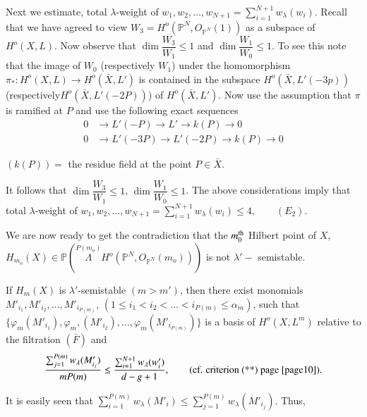 {\noindent
Next we estimate, total $\lambda$-weight of $w_{1}, w_{2} , \ldots ,
w_{N+1} =  \sum\limits^{N+1}_{i=1}   w_{\lambda}(w_{i})$. Recall that
we have agreed to view $W_{3} = H^o (\mathbb{P}^{N},
O_{\mathbb{P}^{N}} (1) )$ as a subspace of $H^o (X, L)$. Now observe
that $\dim \dfrac{W_{3}}{W_{1}} \leq 1$  and $ \dim \dfrac{W_{1}}{W_{0}}
\leq 1$. To see  this note that the image of $W_{0}$ (respectively
$W_{1}$) under the homomorphism $\pi_{*} : H^o (X , L) \to H^o
(\bar{X} , L')$ is contained in the subspace $H^o (\bar{X}, L'
(-3p))$ (respectively\pageoriginale $H^o (\bar{X}, L' (-2P))$)  of
$H^o (\bar{X}, L')$. Now use the assumption that $\pi$ is ramified at
$P$ and use the following exact sequences   
\begin{align*}
0  & \longrightarrow L' (-P)    \longrightarrow L'    \longrightarrow
k(P) \longrightarrow 0\\ 
0  & \longrightarrow L' (-3P)  \longrightarrow L' (-2P)
\longrightarrow k(P) \longrightarrow 0 
\end{align*}

$(k(P)) = $ the residue field at the point $P \in \bar{X}$. 

\noindent
It follows that $\dim \dfrac{W_{3}}{W_{1}} \leq 1$, $\dim
\dfrac{W_{1}}{W_{0}} \leq 1$. The above considerations imply that
total $\lambda$-weight of $w_{1}, w_{2} , \ldots , w_{N+1} =
\sum\limits^{N+1}_{i=1}  w_{\lambda}(w_{i}) \leq 4, \qquad (E_{2})$.  

We are now ready to get the contradiction that the $m^{\rm th}_{0}$
Hilbert point of $X$, $H_{m_{o}} (X) \in \mathbb{P}
(\overset{P(m_{o})}\Lambda  H^o (\mathbb{P}^{N} ,
O_{\mathbb{P}^{N}}(m_{o})))$ is not $\lambda' -$ semistable.  


If $H_{m}(X)$ is $\lambda'$-semistable  $(m > m')$, then there exist
monomials $M'_{i_{1}}, M'_{i_{2}}, \ldots , M'_{i_{P(m)}}$, $(1 \le
i_{1} < i_{2} < \ldots < i_{P(m)} \le \alpha_{m})$, such that
$\{\varphi_{m} (M'_{i_{1}}), \varphi_{m}, (M'_{i_2}), \ldots,
\varphi_m (M'_{i_{P(m)}})\}$ is a
basis of $H^o (X, L^{m})$ relative to the filtration $(\bar{F})$ and  
$$
\frac{\sum^{P(m)}_{j=1} w_{\lambda}(M'_{i_{j}})}{m P(m)} \le
\frac{\sum^{N+1}_{i=1} w_{\lambda}(w'_{i})}{d-g+1}, \qquad
(\text{cf. criterion (**) page \pageref{page10}}). 
 $$

It is easily seen that $\sum\limits^{P(m)}_{i=1}  w_{\lambda}(M'_{i})
\le \sum\limits^{P(m)}_{j=1} w_{\lambda}(M'_{i_{j}})$. Thus, 

}

